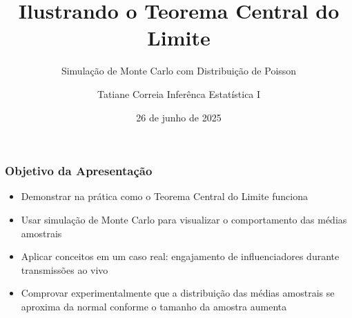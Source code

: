 \documentclass[aspectratio=169,12pt]{beamer}
\title{Ilustrando o Teorema Central do Limite}
\subtitle{\centering Simulação de Monte Carlo com Distribuição de Poisson}
\author{Tatiane Correia Inferênca Estatística I}
\date{26 de junho de 2025}
\institute{}
\begin{document}
\begin{frame}
    \titlepage
\end{frame}

\begin{frame}
    \frametitle{Objetivo da Apresentação}
    
    \begin{itemize}
        \item[\faIcon{bullseye}] Demonstrar na prática como o Teorema Central do Limite funciona
        \vspace{0.5cm}
        
        \item[\faIcon{chart-bar}] Usar simulação de Monte Carlo para visualizar o comportamento das médias amostrais
        \vspace{0.5cm}
        
        \item[\faIcon{users}] Aplicar conceitos em um caso real: engajamento de influenciadores durante transmissões ao vivo
        \vspace{0.5cm}
        
        \item[\faIcon{check-circle}] Comprovar experimentalmente que a distribuição das médias amostrais se aproxima da normal conforme o tamanho da amostra aumenta
    \end{itemize}
\end{frame}
\end{document}
